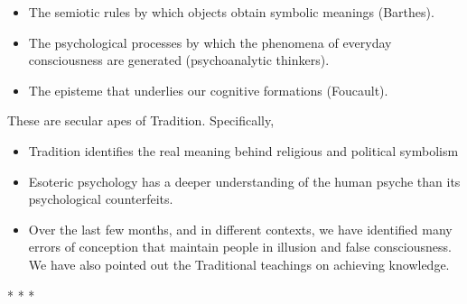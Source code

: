 \begin{itemize}


\item The semiotic rules by which objects obtain symbolic meanings (Barthes).

\item The psychological processes by which the phenomena of everyday consciousness are generated (psychoanalytic thinkers).

\item The episteme that underlies our cognitive formations (Foucault).
\end{itemize}


These are secular apes of Tradition. Specifically,

\begin{itemize}


\item Tradition identifies the real meaning behind religious and political symbolism

\item Esoteric psychology has a deeper understanding of the human psyche than its psychological counterfeits.

\item Over the last few months, and in different contexts, we have identified many errors of conception that maintain people in illusion and false consciousness. We have also pointed out the Traditional teachings on achieving knowledge.
\end{itemize}




\begin{center}* * *\end{center}

